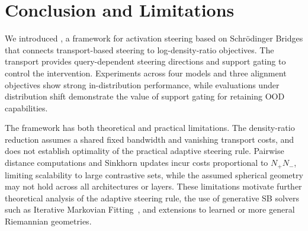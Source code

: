 \vspace{-1mm}\section{Conclusion and Limitations}
\label{sec:conclusion}
We introduced \Cobras, a framework for activation steering based on Schr\"{o}dinger Bridges that connects transport-based steering to log-density-ratio objectives. The transport provides query-dependent steering directions and support gating to control the intervention. Experiments across four models and three alignment objectives show strong in-distribution performance, while evaluations under distribution shift demonstrate the value of support gating for retaining OOD capabilities. 

The framework has both theoretical and practical limitations. The density-ratio reduction assumes a shared fixed bandwidth and vanishing transport costs, and does not establish optimality of the practical adaptive steering rule. Pairwise distance computations and Sinkhorn updates incur costs proportional to $N_+N_-$, limiting scalability to large contrastive sets, while the assumed spherical geometry may not hold across all architectures or layers. These limitations motivate further theoretical analysis of the adaptive steering rule, the use of generative SB solvers such as Iterative Markovian Fitting~\citep{shi2023diffusion}, and extensions to learned or more general Riemannian geometries.
